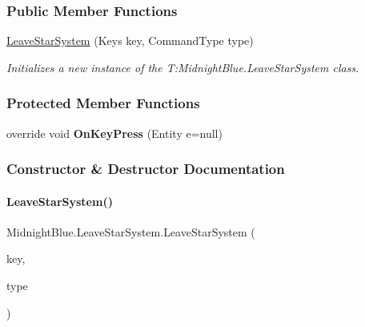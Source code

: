 \subsubsection*{Public Member Functions}
\begin{DoxyCompactItemize}
\item 
\hyperlink{class_midnight_blue_1_1_leave_star_system_a6793d6a941afd58a9e9030d8aec1fe83}{Leave\+Star\+System} (Keys key, Command\+Type type)
\begin{DoxyCompactList}\small\item\em Initializes a new instance of the T\+:\+Midnight\+Blue.\+Leave\+Star\+System class. \end{DoxyCompactList}\end{DoxyCompactItemize}
\subsubsection*{Protected Member Functions}
\begin{DoxyCompactItemize}
\item 
\hypertarget{class_midnight_blue_1_1_leave_star_system_ad2e048edbe7a4816d9ed8fc87cf4eb91}{}\label{class_midnight_blue_1_1_leave_star_system_ad2e048edbe7a4816d9ed8fc87cf4eb91} 
override void {\bfseries On\+Key\+Press} (Entity e=null)
\end{DoxyCompactItemize}


\subsubsection{Constructor \& Destructor Documentation}
\hypertarget{class_midnight_blue_1_1_leave_star_system_a6793d6a941afd58a9e9030d8aec1fe83}{}\label{class_midnight_blue_1_1_leave_star_system_a6793d6a941afd58a9e9030d8aec1fe83} 
\paragraph{\texorpdfstring{Leave\+Star\+System()}{LeaveStarSystem()}}
{\footnotesize\ttfamily Midnight\+Blue.\+Leave\+Star\+System.\+Leave\+Star\+System (\begin{DoxyParamCaption}\item[{Keys}]{key,  }\item[{Command\+Type}]{type }\end{DoxyParamCaption})\hspace{0.3cm}{\ttfamily [inline]}}




